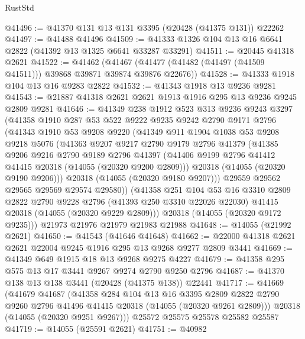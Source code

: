 \begin{lexlean}{RustStd}
\begin{coremodule}
@41496 := @41370 @131 @13 @131 @3395 (@20428 (@41375 @131)) @22262
@41497 := @41488 @41496
@41509 := @41333 @1326 @104 @13 @16 @6641 @2822 (@41392 @13 @1325 @6641 @33287 @33291)
@41511 := @20445 @41318 @2621
@41522 := @41462
    (@41467 (@41477 (@41482 (@41497 (@41509 @41511))) @39868 @39871 @39874 @39876 @22676))
@41528 := @41333 @1918 @104 @13 @16 @9283 @2822
@41532 := @41343 @1918 @13 @9236 @9281
@41543 := @21887 @41318 @2621 @2621 @1913 @1916 @295 @13 @9236 @9245 @2809 @9281
@41646 := @41349
    @238
    @1912
    @523
    @313
    @9236
    @9243
    @3297
    (@41358
      @1910
      @287
      @53
      @522
      @9222
      @9235
      @9242
      @2790
      @9171
      @2796
      (@41343
        @1910
        @53
        @9208
        @9220
        (@41349
          @911
          @1904
          @1038
          @53
          @9208
          @9218
          @5076
          (@41363
            @9207
            @9217
            @2790
            @9179
            @2796
            @41379
            (@41385
              @9206
              @9216
              @2790
              @9189
              @2796
              @41397
              (@41406 @9199 @2796 @41412 @41415 @20318 (@14055 (@20320 @9200 @2809)))
              @20318
              (@14055 (@20320 @9190 @9206)))
            @20318
            (@14055 (@20320 @9180 @9207)))
          @29559
          @29562
          @29565
          @29569
          @29574
          @29580))
      (@41358
        @251
        @104
        @53
        @16
        @3310
        @2809
        @2822
        @2790
        @9228
        @2796
        (@41393 @250 @3310 @22026 @22030)
        @41415
        @20318
        (@14055 (@20320 @9229 @2809)))
      @20318
      (@14055 (@20320 @9172 @9235)))
    @21973
    @21976
    @21979
    @21983
    @21988
@41648 := @14055 (@21992 @2621)
@41650 := @41543 (@41646 @41648)
@41662 := @22000 @41318 @2621 @2621 @22004 @9245 @1916 @295 @13 @9268 @9277 @2809 @3441
@41669 := @41349 @649 @1915 @18 @13 @9268 @9275 @4227
@41679 := @41358 @295 @575 @13 @17 @3441 @9267 @9274 @2790 @9250 @2796
@41687 := @41370 @138 @13 @138 @3441 (@20428 (@41375 @138)) @22441
@41717 := @41669
    (@41679
      @41687
      (@41358
        @284
        @104
        @13
        @16
        @3395
        @2809
        @2822
        @2790
        @9260
        @2796
        @41496
        @41415
        @20318
        (@14055 (@20320 @9261 @2809)))
      @20318
      (@14055 (@20320 @9251 @9267)))
    @25572
    @25575
    @25578
    @25582
    @25587
@41719 := @14055 (@25591 @2621)
@41751 := @40982

\end{coremodule}
\end{lexlean}
